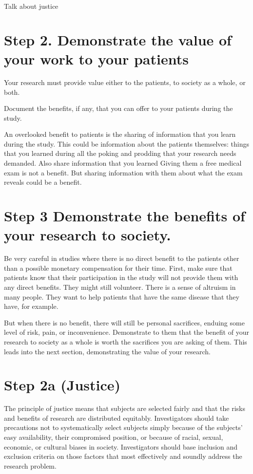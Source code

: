 \documentclass[
  letterpaper,
  DIV=11,
  numbers=noendperiod]{scrreprt}
\begin{document}
Talk about justice

\section{Step 2. Demonstrate the value of your work to your
patients}\label{step-2.-demonstrate-the-value-of-your-work-to-your-patients}

Your research must provide value either to the patients, to society as a
whole, or both.

Document the benefits, if any, that you can offer to your patients
during the study.

An overlooked benefit to patients is the sharing of information that you
learn during the study. This could be information about the patients
themselves: things that you learned during all the poking and prodding
that your research needs demanded. Also share information that you
learned Giving them a free medical exam is not a benefit. But sharing
information with them about what the exam reveals could be a benefit.

\section{Step 3 Demonstrate the benefits of your research to
society.}\label{step-3-demonstrate-the-benefits-of-your-research-to-society.}

Be very careful in studies where there is no direct benefit to the
patients other than a possible monetary compensation for their time.
First, make sure that patients know that their participation in the
study will not provide them with any direct benefits. They might still
volunteer. There is a sense of altruism in many people. They want to
help patients that have the same disease that they have, for example.

But when there is no benefit, there will still be personal sacrifices,
enduing some level of risk, pain, or inconvenience. Demonstrate to them
that the benefit of your research to society as a whole is worth the
sacrifices you are asking of them. This leads into the next section,
demonstrating the value of your research.

\section{Step 2a (Justice)}\label{step-2a-justice}

The principle of justice means that subjects are selected fairly and
that the risks and benefits of research are distributed equitably.
Investigators should take precautions not to systematically select
subjects simply because of the subjects' easy availability, their
compromised position, or because of racial, sexual, economic, or
cultural biases in society. Investigators should base inclusion and
exclusion criteria on those factors that most effectively and soundly
address the research problem.
\end{document}
